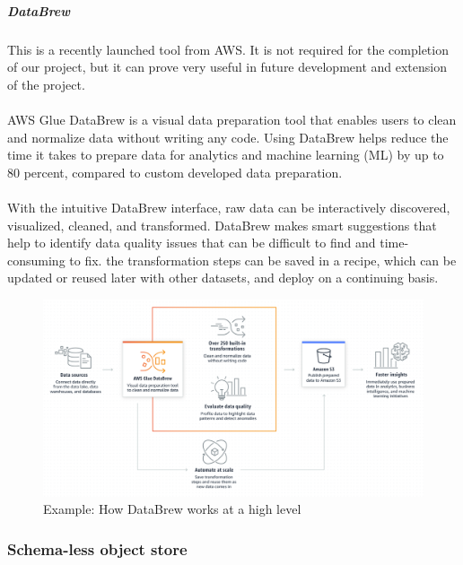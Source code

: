 \documentclass[10pt]{article}
\begin{document}
\subparagraph{DataBrew}
This is a recently launched tool from AWS. It is not required for the completion of our project, but it can prove very useful in future development and extension of the project. \\ \\
AWS Glue DataBrew is a visual data preparation tool that enables users to clean and normalize data without writing any code. Using DataBrew helps reduce the time it takes to prepare data for analytics and machine learning (ML) by up to 80 percent, compared to custom developed data preparation. \\ \\
With the intuitive DataBrew interface, raw data can be interactively discovered, visualized, cleaned, and transformed. DataBrew makes smart suggestions that help to identify data quality issues that can be difficult to find and time-consuming to fix. the transformation steps can be saved in a recipe, which can be updated or reused later with other datasets, and deploy on a continuing basis. \cite{aws-databrew}
\begin{figure}[h!]
	\centering
	\includegraphics[width=0.9\linewidth]{images/databrew-overview-diagram.png}
	\caption*{Example: How DataBrew works at a high level}
\end{figure}

\subsubsection{Schema-less object store}
\end{document}
